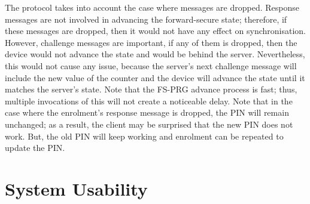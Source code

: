 \documentclass[runningheads]{llncs}
\begin{document}
The protocol takes into account the case where messages are dropped.
Response messages are not involved in advancing the forward-secure state; therefore, if these messages are dropped, then it would not have any effect on synchronisation. However, challenge messages are important, if any of them is dropped, then the device would not advance the state and would be behind the server. Nevertheless, this would not cause any issue, because the server's next challenge message will include the new value of the counter and the device will advance the state until it matches the server's state. Note that 
the FS-PRG advance process is fast; thus,  multiple invocations of this will not create a noticeable delay.
%
 Note that in the case where the enrolment's response message is dropped, the PIN will remain unchanged; as a result,  the client may be surprised that the new PIN does not work. But, the old PIN will keep working and enrolment can be repeated to update the PIN.




\section{System Usability}
\label{sec:asymmetric}



%
\end{document}
